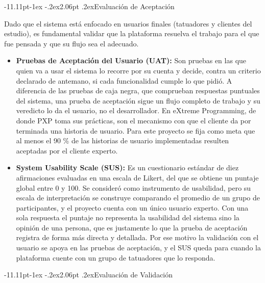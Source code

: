 \documentclass[12pt,letterpaper,oneside]{report}
\makeatletter
\renewcommand\subsubsection{\@startsection{subsubsection}{3}{\z@}%
  {-11.11pt\@plus -1ex \@minus -.2ex}{2.06pt \@plus .2ex}{\normalfont\normalsize\bfseries}}
\makeatother
\begin{document}
\subsubsection{Evaluación de Aceptación}

Dado que el sistema está enfocado en usuarios finales (tatuadores y clientes del estudio), es fundamental validar que la plataforma resuelva el trabajo para el que fue pensada y que su flujo sea el adecuado.
\begin{itemize}
  \item \textbf{Pruebas de Aceptación del Usuario (UAT)\cite{ponce}:} Son pruebas en las que quien va a usar el sistema lo recorre por su cuenta y decide, contra un criterio declarado de antemano, si cada funcionalidad cumple lo que pidió. A diferencia de las pruebas de caja negra, que comprueban respuestas puntuales del sistema, una prueba de aceptación sigue un flujo completo de trabajo y su veredicto lo da el usuario, no el desarrollador. En eXtreme Programming, de donde PXP toma sus prácticas, son el mecanismo con que el cliente da por terminada una historia de usuario\cite{joskowicz2008}. Para este proyecto se fija como meta que al menos el 90 \% de las historias de usuario implementadas resulten aceptadas por el cliente experto.

  \item \textbf{System Usability Scale (SUS)\cite{drew2018}:} Es un cuestionario estándar de diez afirmaciones evaluadas en una escala de Likert, del que se obtiene un puntaje global entre 0 y 100. Se consideró como instrumento de usabilidad, pero su escala de interpretación se construye comparando el promedio de un grupo de participantes, y el proyecto cuenta con un único usuario experto. Con una sola respuesta el puntaje no representa la usabilidad del sistema sino la opinión de una persona, que es justamente lo que la prueba de aceptación registra de forma más directa y detallada. Por ese motivo la validación con el usuario se apoya en las pruebas de aceptación, y el SUS queda para cuando la plataforma cuente con un grupo de tatuadores que lo responda.
\end{itemize}

\subsubsection{Evaluación de Validación}
\end{document}
